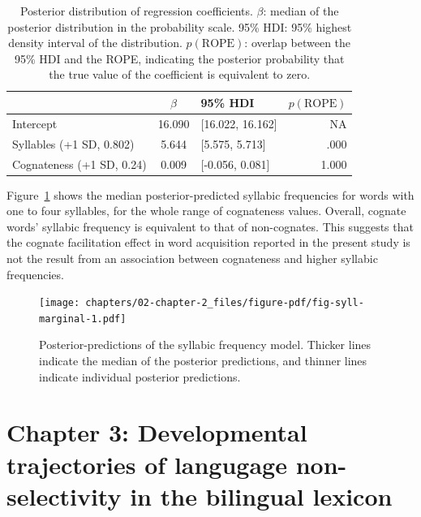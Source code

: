 \documentclass[
  12pt,
  b5paperpaper,
  twoside]{scrreprt}
\newcommand{\blandscape}{\begin{landscape}}
\newcommand{\elandscape}{\end{landscape}}
\begin{document}
\hypertarget{tbl-syll-coefs}{}
\begin{table}
\caption{\label{tbl-syll-coefs}Posterior distribution of regression coefficients. \(\beta\): median of
the posterior distribution in the probability scale. 95\% HDI: 95\%
highest density interval of the distribution. \(p(\text{ROPE})\):
overlap between the 95\% HDI and the ROPE, indicating the posterior
probability that the true value of the coefficient is equivalent to
zero. }\tabularnewline

\centering
\begin{tabular}{lclr}
\toprule
 & $\beta$ & 95\% HDI & $p(\text{ROPE})$\\
\midrule
Intercept & 16.090 & {}[16.022, 16.162] & NA\\
Syllables (+1 SD, 0.802) & 5.644 & {}[5.575, 5.713] & .000\\
Cognateness (+1 SD, 0.24) & 0.009 & {}[-0.056, 0.081] & 1.000\\
\bottomrule
\end{tabular}
\end{table}

Figure~\ref{fig-syll-marginal} shows the median posterior-predicted
syllabic frequencies for words with one to four syllables, for the whole
range of cognateness values. Overall, cognate words' syllabic frequency
is equivalent to that of non-cognates. This suggests that the cognate
facilitation effect in word acquisition reported in the present study is
not the result from an association between cognateness and higher
syllabic frequencies.

\newpage

\blandscape

\begin{figure}

{\centering \texttt{[image: chapters/02-chapter-2\_files/figure-pdf/fig-syll-marginal-1.pdf]}

}

\caption{\label{fig-syll-marginal}Posterior-predictions of the syllabic
frequency model. Thicker lines indicate the median of the posterior
predictions, and thinner lines indicate individual posterior
predictions.}

\end{figure}

\elandscape

\newpage{}


\hypertarget{chapter-3-developmental-trajectories-of-langugage-non-selectivity-in-the-bilingual-lexicon}{%
\chapter{Chapter 3: Developmental trajectories of langugage
non-selectivity in the bilingual
lexicon}\label{chapter-3-developmental-trajectories-of-langugage-non-selectivity-in-the-bilingual-lexicon}}
\end{document}
